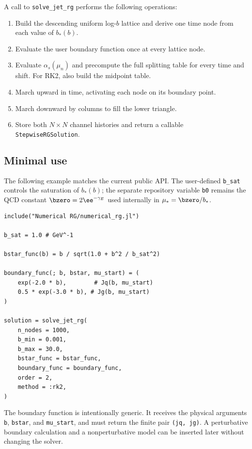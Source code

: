 A call to \texttt{solve\_jet\_rg} performs the following operations:
\begin{enumerate}[leftmargin=1.5em]
  \item Build the descending uniform log-\(b\) lattice and derive one time node
  from each value of \(b_*(b)\).
  \item Evaluate the user boundary function once at every lattice node.
  \item Evaluate \(\alpha_s(\mu_n)\) and precompute the full splitting table
  for every time and shift. For RK2, also build the midpoint table.
  \item March upward in time, activating each node on its boundary point.
  \item March downward by columns to fill the lower triangle.
  \item Store both \(N\times N\) channel histories and return a callable
  \texttt{StepwiseRGSolution}.
\end{enumerate}

\subsection{Minimal use}

The following example matches the current public API. The user-defined
\texttt{b\_sat} controls the saturation of \(b_*(b)\); the separate repository
variable \texttt{b0} remains the QCD constant
\(\bzero=2\ee^{-\gamma_E}\) used internally in \(\mu_*=\bzero/b_*\).

\begin{lstlisting}
include("Numerical RG/numerical_rg.jl")

b_sat = 1.0 # GeV^-1

bstar_func(b) = b / sqrt(1.0 + b^2 / b_sat^2)

boundary_func(; b, bstar, mu_start) = (
    exp(-2.0 * b),        # Jq(b, mu_start)
    0.5 * exp(-3.0 * b), # Jg(b, mu_start)
)

solution = solve_jet_rg(
    n_nodes = 1000,
    b_min = 0.001,
    b_max = 30.0,
    bstar_func = bstar_func,
    boundary_func = boundary_func,
    order = 2,
    method = :rk2,
)
\end{lstlisting}

The boundary function is intentionally generic. It receives the physical
arguments \texttt{b}, \texttt{bstar}, and \texttt{mu\_start}, and must return
the finite pair \texttt{(jq, jg)}. A perturbative boundary calculation and a
nonperturbative model can be inserted later without changing the solver.

